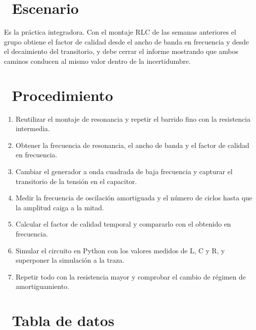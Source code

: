 \documentclass[11pt,a4paper]{article}
\newcommand{\iconotexto}[2]{\textcolor{cyanNeon}{\faIcon{#1}}~#2}
\begin{document}
\section{\iconotexto{flask}{Escenario}}

Es la práctica integradora. Con el montaje RLC de las semanas anteriores el grupo obtiene el factor de calidad desde el ancho de banda en frecuencia y desde el decaimiento del transitorio, y debe cerrar el informe mostrando que ambos caminos conducen al mismo valor dentro de la incertidumbre.

\section{\iconotexto{list-ol}{Procedimiento}}

\begin{enumerate}[leftmargin=1.4em,itemsep=2pt,topsep=3pt]
  \item Reutilizar el montaje de resonancia y repetir el barrido fino con la resistencia intermedia.
  \item Obtener la frecuencia de resonancia, el ancho de banda y el factor de calidad en frecuencia.
  \item Cambiar el generador a onda cuadrada de baja frecuencia y capturar el transitorio de la tensión en el capacitor.
  \item Medir la frecuencia de oscilación amortiguada y el número de ciclos hasta que la amplitud caiga a la mitad.
  \item Calcular el factor de calidad temporal y compararlo con el obtenido en frecuencia.
  \item Simular el circuito en Python con los valores medidos de L, C y R, y superponer la simulación a la traza.
  \item Repetir todo con la resistencia mayor y comprobar el cambio de régimen de amortiguamiento.
\end{enumerate}

\section{\iconotexto{table}{Tabla de datos}}
\end{document}
